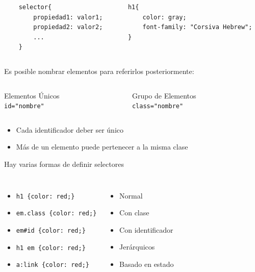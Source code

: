 \documentclass{beamer}
\begin{document}
\begin{frame}[fragile]
	\begin{columns}[c]
	\scriptsize{
	\begin{center}
	\begin{verbatim}
	selector{
	    propiedad1: valor1;
	    propiedad2: valor2;
	    ...
	}
	\end{verbatim}
\end{center}
	}
	\scriptsize{
	\begin{center}
	\begin{verbatim}
	h1{
	    color: gray;
	    font-family: "Corsiva Hebrew";
	}
	\end{verbatim}
	\end{center}
	}
\end{columns}
\end{frame}

\begin{frame}[fragile]
Es posible nombrar elementos para referirlos posteriormente:
	\begin{columns}[t]
	\column{5cm}
	\begin{block}{Elementos Únicos}
	\verb|       id="nombre"|
	\end{block}
	\column{5cm}
	\begin{block}{Grupo de Elementos}
	\verb|     class="nombre"|
	\end{block}
	\end{columns}
	\begin{itemize}
	\item Cada identificador deber ser único
	\item Más de un elemento puede pertenecer a la misma clase
	\end{itemize}
\end{frame}

\begin{frame}[fragile]
Hay varias formas de definir selectores
\begin{columns}[t]
	\begin{itemize}
	\item \verb|h1 {color: red;}|
	\item \verb|em.class {color: red;}|
	\item \verb|em#id {color: red;}|
	\item \verb|h1 em {color: red;}|
	\item \verb|a:link {color: red;}|
	\end{itemize}
	\begin{itemize}
	\item Normal
	\item Con clase
	\item Con identificador
	\item Jerárquicos
	\item Basado en estado
	\end{itemize}
\end{columns}
\end{frame}
\end{document}
